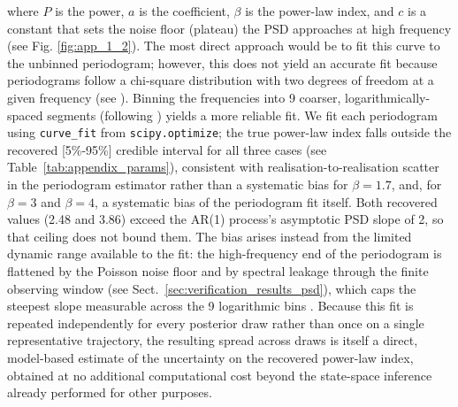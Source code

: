\documentclass{aa}
\begin{document}
where \( P \) is the power, \( a \) is the coefficient, \( \beta \) is the power-law index, and \( c \) is a constant that sets the noise floor (plateau) the PSD approaches at high frequency (see Fig. \ref{fig:app_1_2}). The most direct approach would be to fit this curve to the unbinned periodogram; however, this does not yield an accurate fit because periodograms follow a chi-square distribution with two degrees of freedom at a given frequency (see \citealt{BarretVaughan2012}). Binning the frequencies into 9 coarser, logarithmically-spaced segments (following \citealt{Vaughan2003}) yields a more reliable fit. We fit each periodogram using \texttt{curve\_fit} from \texttt{scipy.optimize}; the true power-law index falls outside the recovered [5\%-95\%] credible interval for all three cases (see Table~\ref{tab:appendix_params}), consistent with realisation-to-realisation scatter in the periodogram estimator rather than a systematic bias for $\beta = 1.7$, and, for $\beta = 3$ and $\beta = 4$, a systematic bias of the periodogram fit itself. Both recovered values (2.48 and 3.86) exceed the AR(1) process's asymptotic PSD slope of 2, so that ceiling does not bound them. The bias arises instead from the limited dynamic range available to the fit: the high-frequency end of the periodogram is flattened by the Poisson noise floor and by spectral leakage through the finite observing window (see Sect.~\ref{sec:verification_results_psd}), which caps the steepest slope measurable across the 9 logarithmic bins \citep[see][Sect.~4.1.2]{Kankkunen2025}. Because this fit is repeated independently for every posterior draw rather than once on a single representative trajectory, the resulting spread across draws is itself a direct, model-based estimate of the uncertainty on the recovered power-law index, obtained at no additional computational cost beyond the state-space inference already performed for other purposes.            
\end{document}
